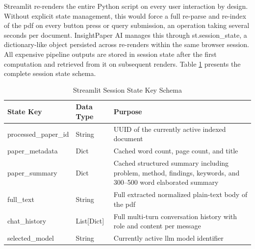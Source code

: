 Streamlit re-renders the entire Python script on every user interaction by design. Without explicit state management, this would force a full re-parse and re-index of the \gls{pdf} on every button press or query submission, an operation taking several seconds per document.
\newline \newline InsightPaper AI manages this through st.session\_state, a dictionary-like object persisted across re-renders within the same browser session. All expensive pipeline outputs are stored in session state after the first computation and retrieved from it on subsequent renders. Table \ref{tab:state} presents the complete session state schema.

\begin{table}[H]

\centering

\caption{Streamlit Session State Key Schema}

\label{tab:state}

\begin{tabular}{|p{3.5cm}|p{2.5cm}|p{7cm}|}

\hline

\textbf{State Key} & \textbf{Data Type} & \textbf{Purpose} \\

\hline

processed\_paper\_id & String & UUID of the currently active indexed document \\

\hline

paper\_metadata & Dict & Cached word count, page count, and title \\

\hline

paper\_summary & Dict & Cached structured summary including problem, method, findings, keywords, and 300–500 word elaborated summary \\

\hline

full\_text & String & Full extracted normalized plain-text body of the \gls{pdf} \\

\hline

chat\_history & List[Dict] & Full multi-turn conversation history with role and content per message \\

\hline

selected\_model & String & Currently active \gls{llm} model identifier \\


\end{tabular}
\end{table}
